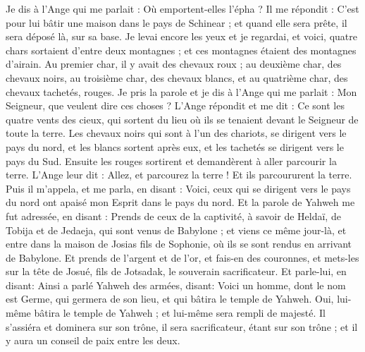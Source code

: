 \begin{multicols}{2}
Je dis à l'Ange qui me parlait : Où emportent-elles l'épha ?
Il me répondit : C'est pour lui bâtir une maison dans le pays de Schinear ; et quand elle sera prête, il sera déposé là, sur sa base.
\VerseOne{}Je levai encore les yeux et je regardai, et voici, quatre chars sortaient d'entre deux montagnes ; et ces montagnes étaient des montagnes d'airain.
Au premier char, il y avait des chevaux roux ; au deuxième char, des chevaux noirs,
au troisième char, des chevaux blancs, et au quatrième char, des chevaux tachetés, rouges.
Je pris la parole et je dis à l'Ange qui me parlait : Mon Seigneur, que veulent dire ces choses ?
L'Ange répondit et me dit : Ce sont les quatre vents des cieux, qui sortent du lieu où ils se tenaient devant le Seigneur de toute la terre.
Les chevaux noirs qui sont à l'un des chariots, se dirigent vers le pays du nord, et les blancs sortent après eux, et les tachetés se dirigent vers le pays du Sud.
Ensuite les rouges sortirent et demandèrent à aller parcourir la terre. L'Ange leur dit : Allez, et parcourez la terre ! Et ils parcoururent la terre.
Puis il m'appela, et me parla, en disant : Voici, ceux qui se dirigent vers le pays du nord ont apaisé mon Esprit dans le pays du nord.
Et la parole de Yahweh me fut adressée, en disant :
Prends de ceux de la captivité, à savoir de Heldaï, de Tobija et de Jedaeja, qui sont venus de Babylone ; et viens ce même jour-là, et entre dans la maison de Josias fils de Sophonie, où ils se sont rendus en arrivant de Babylone.
Et prends de l'argent et de l'or, et fais-en des couronnes, et mets-les sur la tête de Josué, fils de Jotsadak, le souverain sacrificateur.
Et parle-lui, en disant: Ainsi a parlé Yahweh des armées, disant: Voici un homme, dont le nom est Germe, qui germera de son lieu, et qui bâtira le temple de Yahweh.
Oui, lui-même bâtira le temple de Yahweh ; et lui-même sera rempli de majesté. Il s'assiéra et dominera sur son trône, il sera sacrificateur, étant sur son trône ; et il y aura un conseil de paix entre les deux.

\end{multicols}
